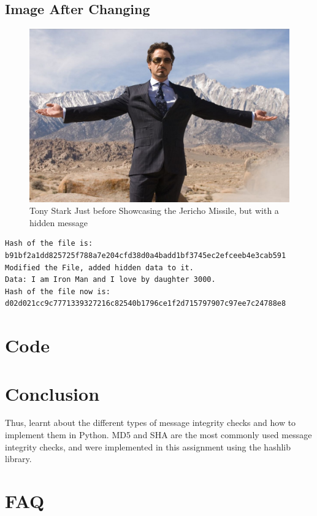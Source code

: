 \documentclass[openany]{book}
\begin{document}
\subsection*{Image After Changing}
\begin{figure}[H]
    \centering
    \includegraphics[width=.90\textwidth]{tony_changed.jpg}
    \caption{Tony Stark Just before Showcasing the Jericho Missile, but with a hidden message}
\end{figure}

\begin{verbatim}
Hash of the file is: 
b91bf2a1dd825725f788a7e204cfd38d0a4badd1bf3745ec2efceeb4e3cab591
Modified the File, added hidden data to it.
Data: I am Iron Man and I love by daughter 3000.
Hash of the file now is: 
d02d021cc9c7771339327216c82540b1796ce1f2d715797907c97ee7c24788e8
\end{verbatim}


\section{Code}


\section{Conclusion}
Thus, learnt about the different types of message integrity checks and how to implement them in Python.
MD5 and SHA are the most commonly used message integrity checks, and were implemented in this assignment using the hashlib library.

\clearpage

\section{FAQ}
\end{document}
